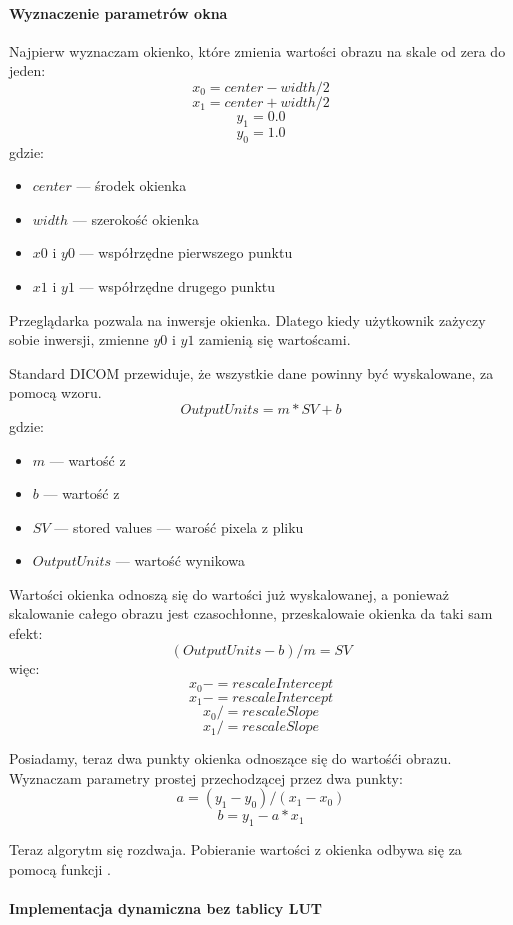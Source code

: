 \paragraph{Wyznaczenie parametrów okna}
\par
Najpierw wyznaczam okienko, które zmienia wartości obrazu na skale od zera do jeden:
\[x_0 = center - width / 2\]
\[x_1 = center + width / 2\]
\[y_1 = 0.0\]
\[y_0 = 1.0\]
gdzie:
\begin{itemize}
    \item $center$ --- środek okienka
    \item $width$ --- szerokość okienka
    \item $x0$ i $y0$ --- współrzędne pierwszego punktu
    \item $x1$ i $y1$ --- współrzędne drugego punktu
\end{itemize}
Przeglądarka pozwala na inwersje okienka.
Dlatego kiedy użytkownik zażyczy sobie inwersji, zmienne $y0$ i $y1$ zamienią się wartoścami.

Standard DICOM przewiduje, że wszystkie dane powinny być wyskalowane, za pomocą wzoru.
\[OutputUnits = m*SV + b\]
gdzie:
\begin{itemize}
    \item $m$ --- wartość z 
    \item $b$ --- wartość z 
    \item $SV$ --- stored values --- warość pixela z pliku
    \item $OutputUnits$ --- wartość wynikowa
\end{itemize}

Wartości okienka odnoszą się do wartości już wyskalowanej, a ponieważ skalowanie całego obrazu jest czasochłonne, przeskalowaie okienka da taki sam efekt:
\[(OutputUnits - b ) / m = SV \]
więc:
\[x_0 -= rescaleIntercept\]
\[x_1 -= rescaleIntercept\]
\[x_0 /= rescaleSlope\]
\[x_1 /= rescaleSlope\]

Posiadamy, teraz dwa punkty okienka odnoszące się do wartośći obrazu.
Wyznaczam parametry prostej przechodzącej przez dwa punkty:
\[a = (y_1 - y_0) / (x_1 - x_0)\]
\[b = y_1 - a * x_1\]

\par
Teraz algorytm się rozdwaja.
Pobieranie wartości z okienka odbywa się za pomocą funkcji .

\paragraph{Implementacja dynamiczna bez tablicy LUT}

